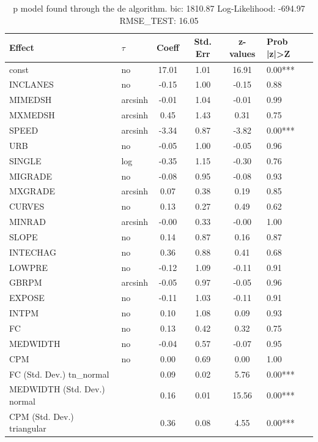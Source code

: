 \begin{table}
	\caption{p model found through the de algorithm. bic: 1810.87 Log-Likelihood: -694.97 RMSE_TEST: 16.05}
	\begin{center}
		\begin{tabular}{|l|l|c|c|c|l|}
			\hline
			Effect & $\tau$ & Coeff & Std. Err & z-values & Prob |z|>Z \\
			\hline
			const & no & 17.01 & 1.01 & 16.91 & 0.00*** \\
			\hline
			INCLANES & no & -0.15 & 1.00 & -0.15 & 0.88 \\
			\hline
			MIMEDSH & arcsinh & -0.01 & 1.04 & -0.01 & 0.99 \\
			\hline
			MXMEDSH & arcsinh & 0.45 & 1.43 & 0.31 & 0.75 \\
			\hline
			SPEED & arcsinh & -3.34 & 0.87 & -3.82 & 0.00*** \\
			\hline
			URB & no & -0.05 & 1.00 & -0.05 & 0.96 \\
			\hline
			SINGLE & log & -0.35 & 1.15 & -0.30 & 0.76 \\
			\hline
			MIGRADE & no & -0.08 & 0.95 & -0.08 & 0.93 \\
			\hline
			MXGRADE & arcsinh & 0.07 & 0.38 & 0.19 & 0.85 \\
			\hline
			CURVES & no & 0.13 & 0.27 & 0.49 & 0.62 \\
			\hline
			MINRAD & arcsinh & -0.00 & 0.33 & -0.00 & 1.00 \\
			\hline
			SLOPE & no & 0.14 & 0.87 & 0.16 & 0.87 \\
			\hline
			INTECHAG & no & 0.36 & 0.88 & 0.41 & 0.68 \\
			\hline
			LOWPRE & no & -0.12 & 1.09 & -0.11 & 0.91 \\
			\hline
			GBRPM & arcsinh & -0.05 & 0.97 & -0.05 & 0.96 \\
			\hline
			EXPOSE & no & -0.11 & 1.03 & -0.11 & 0.91 \\
			\hline
			INTPM & no & 0.10 & 1.08 & 0.09 & 0.93 \\
			\hline
			FC & no & 0.13 & 0.42 & 0.32 & 0.75 \\
			\hline
			MEDWIDTH & no & -0.04 & 0.57 & -0.07 & 0.95 \\
			\hline
			CPM & no & 0.00 & 0.69 & 0.00 & 1.00 \\
			\hline
			FC (Std. Dev.) tn_normal &  & 0.09 & 0.02 & 5.76 & 0.00*** \\
			\hline
			MEDWIDTH (Std. Dev.) normal &  & 0.16 & 0.01 & 15.56 & 0.00*** \\
			\hline
			CPM (Std. Dev.) triangular &  & 0.36 & 0.08 & 4.55 & 0.00*** \\
			\hline
		\end{tabular}
	\end{center}
\end{table}